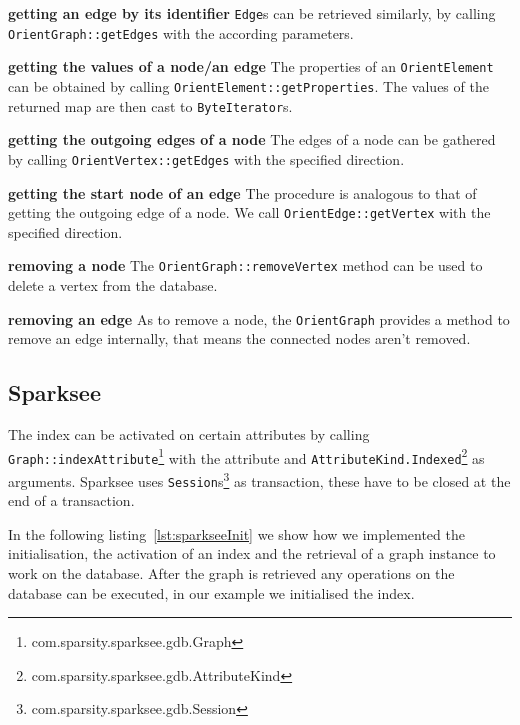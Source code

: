 \textbf{getting an edge by its identifier} \newline
\texttt{Edge}s can be retrieved similarly,
by calling \texttt{OrientGraph::getEdges} with the according parameters.

\textbf{getting the values of a node/an edge} \newline
The properties of an \texttt{OrientElement} can be obtained by calling
\texttt{OrientElement::\allowbreak getProperties}.
The values of the returned map are then cast to \texttt{ByteIterator}s.

\textbf{getting the outgoing edges of a node} \newline
The edges of a node can be gathered by calling \texttt{OrientVertex::getEdges} with the specified direction.

\textbf{getting the start node of an edge} \newline
The procedure is analogous to that of getting the outgoing edge of a node.
We call \texttt{OrientEdge::getVertex} with the specified direction.

\textbf{removing a node} \newline
The \texttt{OrientGraph::removeVertex} method can be used to delete a vertex from the database.

\textbf{removing an edge} \newline
As to remove a node,
the \texttt{OrientGraph} provides a method to remove an edge internally,
that means the connected nodes aren't removed.

\subsection{Sparksee}
The index can be activated on certain attributes by calling \texttt{Graph::indexAttribute}\footnote{com.sparsity.sparksee.gdb.Graph} with the attribute and \texttt{AttributeKind.Indexed}\footnote{com.sparsity.sparksee.gdb.AttributeKind} as arguments.
Sparksee uses \texttt{Session}s\footnote{com.sparsity.sparksee.gdb.Session} as transaction,
these have to be closed at the end of a transaction.

In the following listing~\ref{lst:sparkseeInit} we show how we implemented the initialisation, the activation of an index and the retrieval of a graph instance to work on the database.
After the graph is retrieved any operations on the database can be executed,
in our example we initialised the index.

